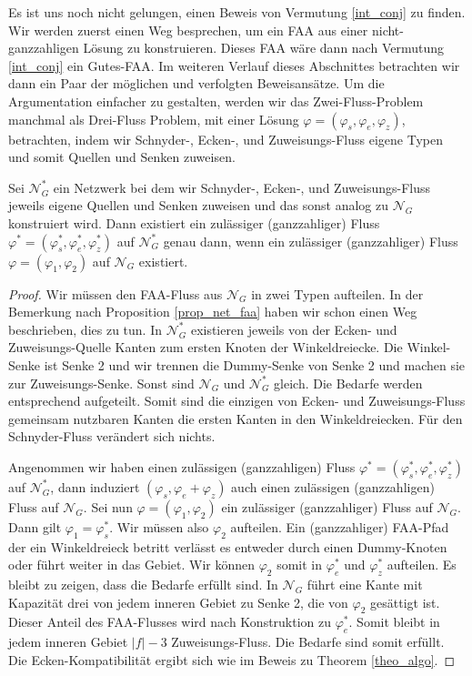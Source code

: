 Es ist uns noch nicht gelungen, einen Beweis von Vermutung \ref{int_conj} zu finden. Wir werden zuerst einen Weg besprechen, um ein FAA aus einer nicht-ganzzahligen Lösung zu konstruieren. Dieses FAA wäre dann nach Vermutung \ref{int_conj} ein Gutes-FAA. Im weiteren Verlauf dieses Abschnittes betrachten wir dann ein Paar der möglichen und verfolgten Beweisansätze. Um die Argumentation einfacher zu gestalten, werden wir das Zwei-Fluss-Problem manchmal als Drei-Fluss Problem, mit einer Lösung $\varphi=(\varphi_s,\varphi_e,\varphi_z)$, betrachten, indem wir Schnyder-, Ecken-, und Zuweisungs-Fluss eigene Typen und somit Quellen und Senken zuweisen.

\begin{proposition}
Sei $\mathcal{N}^*_G$ ein Netzwerk bei dem wir Schnyder-, Ecken-, und Zuweisungs-Fluss jeweils eigene Quellen und Senken zuweisen und das sonst analog zu $\mathcal{N}_G$ konstruiert wird. Dann existiert ein zulässiger (ganzzahliger) Fluss $\varphi^*=(\varphi^*_s,\varphi^*_e,\varphi^*_z)$ auf $\mathcal{N}^*_G$ genau dann, wenn ein zulässiger (ganzzahliger) Fluss $\varphi=(\varphi_1,\varphi_2)$ auf 
$\mathcal{N}_G$ existiert.
\end{proposition}

\begin{proof}
Wir müssen den FAA-Fluss aus $\mathcal{N}_G$ in zwei Typen aufteilen. In der Bemerkung nach Proposition \ref{prop_net_faa} haben wir schon einen Weg beschrieben, dies zu tun. In $\mathcal{N}_G^*$ existieren jeweils von der Ecken- und Zuweisungs-Quelle Kanten zum ersten Knoten der Winkeldreiecke. Die Winkel-Senke ist Senke 2 und wir trennen die Dummy-Senke von Senke 2 und machen sie zur Zuweisungs-Senke. Sonst sind $\mathcal{N}_G$ und $\mathcal{N}^*_G$ gleich. Die Bedarfe werden entsprechend aufgeteilt. Somit sind die einzigen von Ecken- und Zuweisungs-Fluss gemeinsam nutzbaren Kanten die ersten Kanten in den Winkeldreiecken. Für den Schnyder-Fluss verändert sich nichts.

Angenommen wir haben einen zulässigen (ganzzahligen) Fluss $\varphi^*=(\varphi^*_s,\varphi^*_e,\varphi^*_z)$ auf $\mathcal{N}_G^*$, dann induziert $(\varphi_s,\varphi_e+\varphi_z)$ auch einen zulässigen (ganzzahligen) Fluss auf $\mathcal{N}_G$. Sei nun $\varphi=(\varphi_1,\varphi_2)$ ein zulässiger (ganzzahliger) Fluss auf $\mathcal{N}_G$. Dann gilt $\varphi_1 = \varphi^*_s$. Wir müssen also $\varphi_2$ aufteilen. Ein (ganzzahliger) FAA-Pfad der ein Winkeldreieck betritt verlässt es entweder durch einen Dummy-Knoten oder führt weiter in das Gebiet. Wir können $\varphi_2$ somit in $\varphi_e^*$ und $\varphi_z^*$ aufteilen. Es bleibt zu zeigen, dass die Bedarfe erfüllt sind. In $\mathcal{N}_G$ führt eine Kante mit Kapazität drei von jedem inneren Gebiet zu Senke 2, die von $\varphi_2$ gesättigt ist. Dieser Anteil des FAA-Flusses wird nach Konstruktion zu $\varphi_e^*$. Somit bleibt in jedem inneren Gebiet $|f|-3$ Zuweisungs-Fluss. Die Bedarfe sind somit erfüllt. Die Ecken-Kompatibilität ergibt sich wie im Beweis zu Theorem \ref{theo_algo}.
\end{proof}

